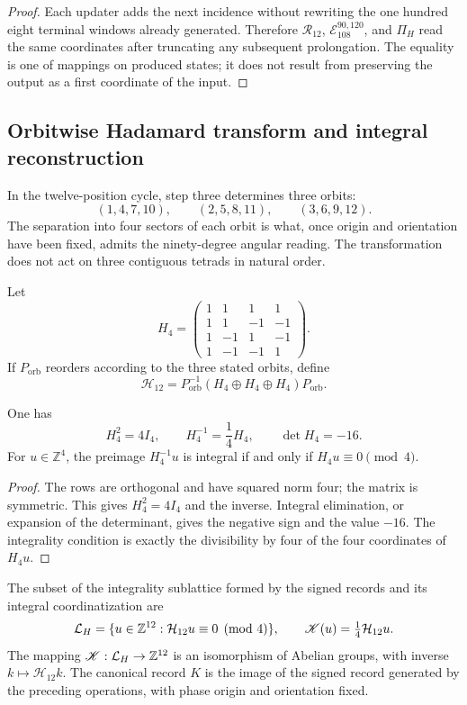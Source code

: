 \begin{proof}
Each updater adds the next incidence without rewriting the one hundred eight
terminal windows already generated. Therefore \(\mathcal R_{12}\),
\(\mathcal E_{108}^{90,120}\), and \(\Pi_H\) read the same coordinates after
truncating any subsequent prolongation. The equality is one of mappings on
produced states; it does not result from preserving the output as a first
coordinate of the input.
\end{proof}

\subsection{Orbitwise Hadamard transform and integral reconstruction}
\label{subsec:k-hadamard}

In the twelve-position cycle, step three determines three orbits:
\[
 (1,4,7,10),\qquad(2,5,8,11),\qquad(3,6,9,12).
\]
The separation into four sectors of each orbit is what, once origin and
orientation have been fixed, admits the ninety-degree angular reading. The
transformation does not act on three contiguous tetrads in natural order.

Let
\[
 H_4=\begin{pmatrix}
 1&1&1&1\\1&1&-1&-1\\1&-1&1&-1\\1&-1&-1&1
 \end{pmatrix}.
\]
If \(P_{\mathrm{orb}}\) reorders according to the three stated orbits,
define
\[
 \mathcal H_{12}=P_{\mathrm{orb}}^{-1}
 (H_4\oplus H_4\oplus H_4)P_{\mathrm{orb}}.
\]

\begin{lemma}
\label{lem:k-hadamard}
One has
\[
 H_4^2=4I_4,\qquad H_4^{-1}=\frac14H_4,\qquad\det H_4=-16.
\]
For \(u\in\mathbb Z^4\), the preimage \(H_4^{-1}u\) is integral if and only
if \(H_4u\equiv0\pmod4\).
\end{lemma}

\begin{proof}
The rows are orthogonal and have squared norm four; the matrix is symmetric.
This gives \(H_4^2=4I_4\) and the inverse. Integral elimination, or expansion
of the determinant, gives the negative sign and the value \(-16\). The
integrality condition is exactly the divisibility by four of the four
coordinates of \(H_4u\).
\end{proof}

\begin{definition}
The subset of the integrality sublattice formed by the signed records and its integral coordinatization are
\[
 \mathcal L_H=\{u\in\mathbb Z^{12}:\mathcal H_{12}u\equiv0\pmod4\},
 \qquad \mathscr K(u)=\tfrac14\mathcal H_{12}u.
\]
The mapping \(\mathscr K:\mathcal L_H\to\mathbb Z^{12}\) is an isomorphism
of Abelian groups, with inverse \(k\mapsto\mathcal H_{12}k\).
The canonical record \(K\) is the image of the signed record generated
by the preceding operations, with phase origin and orientation fixed.
\end{definition}


